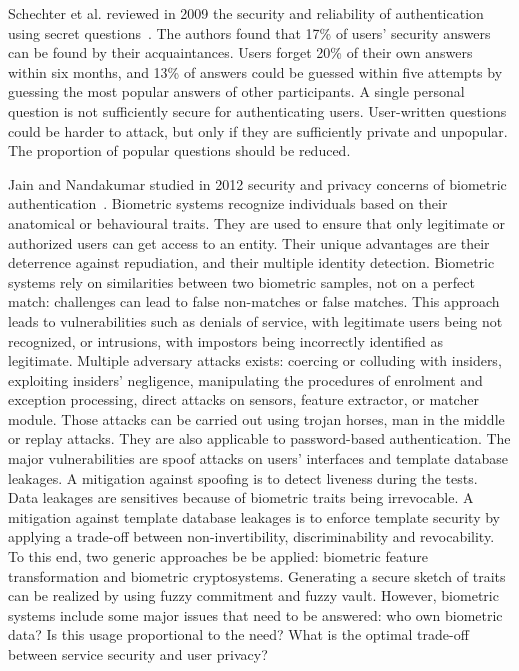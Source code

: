 Schechter et al. reviewed in 2009 the security and reliability of authentication using secret questions~\cite{schechter_its_2009}. The authors found that 17\% of users' security answers can be found by their acquaintances. Users forget 20\% of their own answers within six months, and 13\% of answers could be guessed within five attempts by guessing the most popular answers of other participants. A single personal question is not sufficiently secure for authenticating users. User-written questions could be harder to attack, but only if they are sufficiently private and unpopular. The proportion of popular questions should be reduced. %

Jain and Nandakumar studied in 2012 security and privacy concerns of biometric authentication~\cite{jain_biometric_2012}. Biometric systems recognize individuals based on their anatomical or behavioural traits. They are used to ensure that only legitimate or authorized users can get access to an entity. Their unique advantages are their deterrence against repudiation, and their multiple identity detection. Biometric systems rely on similarities between two biometric samples, not on a perfect match: challenges can lead to false non-matches or false matches. This approach leads to vulnerabilities such as denials of service, with legitimate users being not recognized, or intrusions, with impostors being incorrectly identified as legitimate. Multiple adversary attacks exists: coercing or colluding with insiders, exploiting insiders' negligence, manipulating the procedures of enrolment and exception processing, direct attacks on sensors, feature extractor, or matcher module. Those attacks can be carried out using trojan horses, man in the middle or replay attacks. They are also applicable to password-based authentication. The major vulnerabilities are spoof attacks on users' interfaces and template database leakages. A mitigation against spoofing is to detect liveness during the tests. Data leakages are sensitives because of biometric traits being irrevocable. A mitigation against template database leakages is to enforce template security by applying a trade-off between non-invertibility, discriminability and revocability. To this end, two generic approaches be be applied: biometric feature transformation and biometric cryptosystems. Generating a secure sketch of traits can be realized by using fuzzy commitment and fuzzy vault. However, biometric systems include some major issues that need to be answered: who own biometric data? Is this usage proportional to the need? What is the optimal trade-off between service security and user privacy? %


